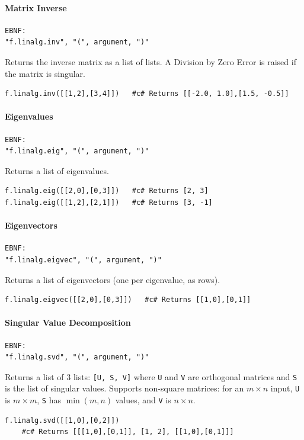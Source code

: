 \paragraph{Matrix Inverse}
\begin{verbatim}
EBNF:
"f.linalg.inv", "(", argument, ")"
\end{verbatim}
Returns the inverse matrix as a list of lists. A Division by Zero Error is raised if the matrix is singular.
\begin{verbatim}
f.linalg.inv([[1,2],[3,4]])   #c# Returns [[-2.0, 1.0],[1.5, -0.5]]
\end{verbatim}

\paragraph{Eigenvalues}
\begin{verbatim}
EBNF:
"f.linalg.eig", "(", argument, ")"
\end{verbatim}
Returns a list of eigenvalues.
\begin{verbatim}
f.linalg.eig([[2,0],[0,3]])   #c# Returns [2, 3]
f.linalg.eig([[1,2],[2,1]])   #c# Returns [3, -1]
\end{verbatim}

\paragraph{Eigenvectors}
\begin{verbatim}
EBNF:
"f.linalg.eigvec", "(", argument, ")"
\end{verbatim}
Returns a list of eigenvectors (one per eigenvalue, as rows).
\begin{verbatim}
f.linalg.eigvec([[2,0],[0,3]])   #c# Returns [[1,0],[0,1]]
\end{verbatim}

\paragraph{Singular Value Decomposition}
\begin{verbatim}
EBNF:
"f.linalg.svd", "(", argument, ")"
\end{verbatim}
Returns a list of 3 lists: \texttt{[U, S, V]} where \texttt{U} and \texttt{V} are orthogonal matrices and \texttt{S} is the list of singular values. Supports non-square matrices: for an $m \times n$ input, \texttt{U} is $m \times m$, \texttt{S} has $\min(m, n)$ values, and \texttt{V} is $n \times n$.
\begin{verbatim}
f.linalg.svd([[1,0],[0,2]])
    #c# Returns [[[1,0],[0,1]], [1, 2], [[1,0],[0,1]]]
\end{verbatim}

